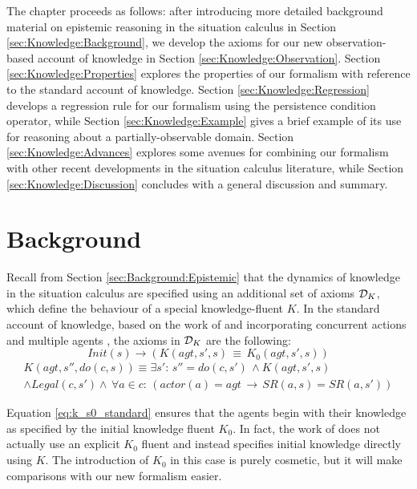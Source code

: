 The chapter proceeds as follows: after introducing more detailed background
material on epistemic reasoning in the situation calculus in Section
\ref{sec:Knowledge:Background}, we develop the axioms for our new
observation-based account of knowledge in Section \ref{sec:Knowledge:Observation}.
Section \ref{sec:Knowledge:Properties} explores the properties of
our formalism with reference to the standard account of knowledge.
Section \ref{sec:Knowledge:Regression} develops a regression rule
for our formalism using the persistence condition operator, while
Section \ref{sec:Knowledge:Example} gives a brief example of its
use for reasoning about a partially-observable domain. Section \ref{sec:Knowledge:Advances}
explores some avenues for combining our formalism with other recent
developments in the situation calculus literature, while Section \ref{sec:Knowledge:Discussion}
concludes with a general discussion and summary.


\section{Background\label{sec:Knowledge:Background}}

Recall from Section \ref{sec:Background:Epistemic} that the dynamics
of knowledge in the situation calculus are specified using an additional
set of axioms $\mathcal{D}_{K}$, which define the behaviour of a special
knowledge-fluent $K$. In the standard account of knowledge, based
on the work of \citet{scherl03sc_knowledge} and incorporating concurrent
actions and multiple agents \citep{shapiro98specifying_ma_systems,scherl03conc_knowledge},
the axioms in $\mathcal{D}_{K}$ are the following:\begin{equation}
Init(s)\rightarrow\left(K(agt,s',s)\,\equiv\, K_{0}(agt,s',s)\right)\label{eq:k_s0_standard}\end{equation}
 \begin{multline}
K(agt,s'',do(c,s))\equiv\exists s':\, s''=do(c,s')\,\wedge K(agt,s',s)\\
\wedge Legal(c,s')\wedge\,\forall a\in c:\,\left(actor(a)=agt\,\rightarrow\, SR(a,s)=SR(a,s')\right)\label{eq:k_ssa_standard}\end{multline}


Equation \eqref{eq:k_s0_standard} ensures that the agents begin with
their knowledge as specified by the initial knowledge fluent $K_{0}$.
In fact, the work of \citep{scherl03sc_knowledge,shapiro98specifying_ma_systems,scherl03conc_knowledge}
does not actually use an explicit $K_{0}$ fluent and instead specifies
initial knowledge directly using $K$. The introduction of $K_{0}$
in this case is purely cosmetic, but it will make comparisons with
our new formalism easier.

